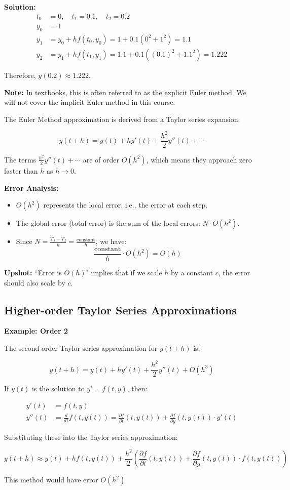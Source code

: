 \documentclass{article}
\begin{document}
\textbf{Solution:}
\begin{align*}
    t_0 &= 0, \quad t_1 = 0.1, \quad t_2 = 0.2 \\[6pt]
    y_0 &= 1 \\[6pt]
    y_1 &= y_0 + hf(t_0, y_0) = 1 + 0.1(0^2 + 1^2) = 1.1 \\[6pt]
    y_2 &= y_1 + hf(t_1, y_1) = 1.1 + 0.1((0.1)^2 + 1.1^2) = 1.222
\end{align*}

Therefore, $y(0.2) \approx 1.222$.


\textbf{Note:} In textbooks, this is often referred to as the explicit Euler method. We will not cover the implicit Euler method in this course.

The Euler Method approximation is derived from a Taylor series expansion:

\[
y(t+h) = y(t) + hy'(t) + \frac{h^2}{2}y''(t) + \cdots
\]

The terms $\frac{h^2}{2}y''(t) + \cdots$ are of order $O(h^2)$, which means they approach zero faster than $h$ as $h \to 0$.



\textbf{Error Analysis:}
\begin{itemize}
    \item $O(h^2)$ represents the local error, i.e., the error at each step.
    \item The global error (total error) is the sum of the local errors: $N \cdot O(h^2)$.
    \item Since $N = \frac{T_f - T_I}{h} = \frac{\text{constant}}{h}$, we have:
    \[
    \frac{\text{constant}}{h} \cdot O(h^2) = O(h)
    \]
\end{itemize}

\textbf{Upshot:} ``Error is $O(h)$" implies that if we scale $h$ by a constant $c$, the error should also scale by $c$.

\subsection*{Higher-order Taylor Series Approximations}

\textbf{Example: Order 2}

The second-order Taylor series approximation for $y(t+h)$ is:

\[
y(t+h) = y(t) + hy'(t) + \frac{h^2}{2} y''(t) + O(h^3)
\]

If $y(t)$ is the solution to $y' = f(t,y)$, then:

\begin{align*}
y'(t) &= f(t,y) \\
y''(t) &= \frac{d}{dt}f(t,y(t)) = \frac{\partial f}{\partial t}(t,y(t)) + \frac{\partial f}{\partial y}(t,y(t)) \cdot y'(t)
\end{align*}

Substituting these into the Taylor series approximation:

\[
y(t+h) \approx y(t) + hf(t,y(t)) + \frac{h^2}{2} \left(\frac{\partial f}{\partial t}(t,y(t)) + \frac{\partial f}{\partial y}(t,y(t)) \cdot f(t,y(t))\right)
\]

This method would have error $O(h^2)$
\end{document}
